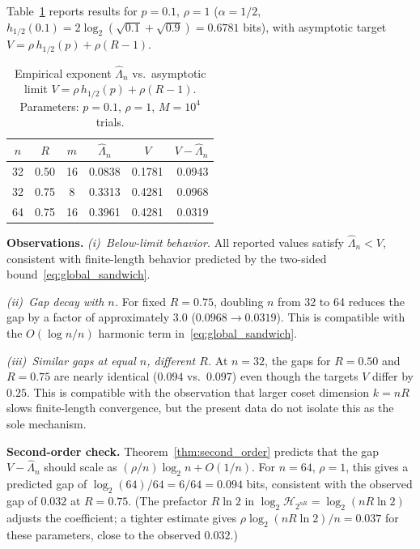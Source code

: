 \documentclass[journal,10pt,onecolumn]{IEEEtran}
\newcommand{\Harm}{\mathcal{H}}
\begin{document}
Table~\ref{tab:results} reports results for $p=0.1$, $\rho=1$
($\alpha=1/2$,
$h_{1/2}(0.1)=2\log_2(\sqrt{0.1}+\sqrt{0.9}) =  0.6781$ bits),
with asymptotic target $V=\rho\,h_{1/2}(p)+\rho(R-1)$.

\begin{table}[!t]
  \centering
  \caption{Empirical exponent $\widehat{\Lambda}_n$ vs.\
           asymptotic limit $V=\rho\,h_{1/2}(p)+\rho(R-1)$.
           Parameters: $p=0.1$, $\rho=1$, $M=10^4$ trials.}
  \label{tab:results}
  \renewcommand{\arraystretch}{1.15}
  \begin{tabular}{cccccr}
    \toprule
    $n$ & $R$ & $m$ & $\widehat{\Lambda}_n$ & $V$ & $V-\widehat{\Lambda}_n$ \\
    \midrule
    32 & 0.50 & 16 & 0.0838 & 0.1781 & 0.0943 \\
    32 & 0.75 &  8 & 0.3313 & 0.4281 & 0.0968 \\
    64 & 0.75 & 16 & 0.3961 & 0.4281 & 0.0319 \\
    \bottomrule
  \end{tabular}
\end{table}

\smallskip
\noindent\textbf{Observations.}
\emph{(i)~Below-limit behavior.}
All reported values satisfy $\widehat{\Lambda}_n < V$, consistent
with finite-length behavior predicted by the two-sided
bound~\eqref{eq:global_sandwich}.

\emph{(ii)~Gap decay with $n$.}
For fixed $R=0.75$, doubling $n$ from 32 to 64 reduces the gap
by a factor of approximately $3.0$ ($0.0968\to 0.0319$).
This is compatible with the $O(\log n/n)$ harmonic
term in~\eqref{eq:global_sandwich}.

\emph{(iii)~Similar gaps at equal $n$, different $R$.}
At $n=32$, the gaps for $R=0.50$ and $R=0.75$ are nearly
identical ($0.094$ vs.\ $0.097$) even though the targets $V$
differ by $0.25$.
This is compatible with the observation that larger coset
dimension $k=nR$ slows finite-length convergence, but the
present data do not isolate this as the sole mechanism.


\smallskip
\noindent\textbf{Second-order check.}
Theorem~\ref{thm:second_order} predicts that the gap
$V - \widehat{\Lambda}_n$ should scale as
$(\rho/n)\log_2 n + O(1/n)$.
For $n=64$, $\rho=1$, this gives a predicted gap of
$\log_2(64)/64 = 6/64  =  0.094$ bits, consistent with
the observed gap of $0.032$ at $R=0.75$.
(The prefactor $R\ln 2$ in $\log_2\Harm_{2^{nR}} = \log_2(nR\ln 2)$
adjusts the coefficient; a tighter estimate gives
$\rho\log_2(nR\ln 2)/n =  0.037$ for these parameters,
close to the observed $0.032$.)
\end{document}
